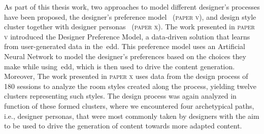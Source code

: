 As part of this thesis work, two approaches to model different designer's processes have been proposed, the designer's preference model~\cite{alvarez_learning_2020} (\textsc{paper v}), and design style cluster together with designer personas~\cite{alvarez_designer_2022} (\textsc{paper x}). The work presented in \textsc{paper v} introduced the Designer Preference Model, a data-driven solution that learns from user-generated data in the~\acrshort{edd}. This preference model uses an Artificial Neural Network to model the designer's preferences based on the choices they make while using~\acrshort{edd}, which is then used to drive the content generation. Moreover, The work presented in \textsc{paper x} uses data from the design process of 180 sessions to analyze the room styles created along the process, yielding twelve clusters representing such styles. The design process was again analyzed in function of these formed clusters, where we encountered four archetypical paths, i.e., designer personas, that were most commonly taken by designers with the aim to be used to drive the generation of content towards more adapted content. 








